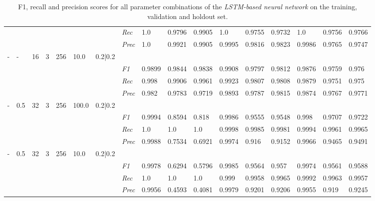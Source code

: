 \begin{table}[H]
\begin{tabularx}{\textwidth}{XXXXXXX|X|XXX|XXX|XXX}
    & & & & & & & \textit{Rec} & 1.0 & 0.9796 & 0.9905    & 1.0 & 0.9755    & 0.9732    & 1.0    & 0.9756    & 0.9766    \\
    & & & & & & & \textit{Prec} & 1.0 & 0.9921 & 0.9905 & 0.9995 & 0.9816 & 0.9823 & 0.9986 & 0.9765 & 0.9747 \\ \midrule
    - & - & 16 & 3 & 256 &10.0 & 0.2|0.2 & & & & & & & & & \\
    & & & & & & & \textit{F1} & 0.9899 & 0.9844 & 0.9838 & 0.9908 & 0.9797        & 0.9812        & 0.9876        & 0.9759        & 0.976        \\
    & & & & & & & \textit{Rec} & 0.998 & 0.9906 & 0.9961    & 0.9923 & 0.9807    & 0.9808    & 0.9879    & 0.9751    & 0.975    \\
    & & & & & & & \textit{Prec} & 0.982 & 0.9783 & 0.9719 & 0.9893 & 0.9787 & 0.9815 & 0.9874 & 0.9767 & 0.9771 \\ \midrule
    - & 0.5 & 32 & 3 & 256 &100.0 & 0.2|0.2 & & & & & & & & & \\
    & & & & & & & \textit{F1} & 0.9994 & 0.8594 & 0.818 & 0.9986 & 0.9555        & 0.9548        & 0.998        & 0.9707        & 0.9722        \\
    & & & & & & & \textit{Rec} & 1.0 & 1.0 & 1.0    & 0.9998 & 0.9985    & 0.9981    & 0.9994    & 0.9961    & 0.9965    \\
    & & & & & & & \textit{Prec} & 0.9988 & 0.7534 & 0.6921 & 0.9974 & 0.916 & 0.9152 & 0.9966 & 0.9465 & 0.9491 \\ \midrule
    - & 0.5 & 32 & 3 & 256 &10.0 & 0.2|0.2 & & & & & & & & & \\
    & & & & & & & \textit{F1} & 0.9978 & 0.6294 & 0.5796 & 0.9985 & 0.9564        & 0.957        & 0.9974        & 0.9561        & 0.9588        \\
    & & & & & & & \textit{Rec} & 1.0 & 1.0 & 1.0    & 0.999 & 0.9958    & 0.9965    & 0.9992    & 0.9963    & 0.9957    \\
    & & & & & & & \textit{Prec} & 0.9956 & 0.4593 & 0.4081 & 0.9979 & 0.9201 & 0.9206 & 0.9955 & 0.919 & 0.9245 \\ \midrule
    \end{tabularx}
    \caption{F1, recall and precision scores for all parameter combinations of the \textit{LSTM-based neural network} on the training, validation and holdout set.}
    \label{tab:all_results_lstm}
    \end{table}


